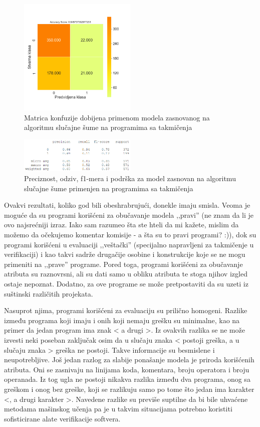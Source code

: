 \documentclass[12pt,oneside]{memoir}
\begin{document}
\begin{figure}[!ht]
  \centering
  \includegraphics[width=0.5\textwidth]{RF_c_files_confussion_matrix}
  \caption{Matrica konfuzije dobijena primenom modela zasnovanog na algoritmu slučajne šume na programima sa takmičenja}
  \label{fig:confmfinal}
\end{figure}

\begin{figure}[!ht]
  \centering
  \includegraphics[width=0.5\textwidth]{extra_final}
  \caption{Preciznost, odziv, f1-mera i podrška za model zasnovan na algoritmu slučajne šume primenjen na programima sa takmičenja}
  \label{fig:extrafinal}
\end{figure}


Ovakvi rezultati, koliko god bili obeshrabrujući, donekle imaju smisla. Veoma je moguće da su programi korišćeni za obučavanje modela ,,pravi'' (ne znam da li je ovo najsrećniji izraz. Iako sam razumeo šta ste hteli da mi kažete, mislim da možemo da očekujemo komentar komisije - a šta su to pravi programi? :)), dok su programi korišćeni u evaluaciji ,,veštački'' (specijalno napravljeni za takmičenje u verifikaciji) i kao takvi sadrže drugačije osobine i konstrukcije koje se ne mogu primeniti na ,,prave'' programe. Pored toga, programi korišćeni za obučavanje atributa su raznovrsni, ali su dati samo u obliku atributa te stoga njihov izgled ostaje nepoznat. Dodatno, za ove programe se može pretpostaviti da su uzeti iz suštinski različitih projekata. 

Nasuprot njima, programi korišćeni za evaluaciju su prilično homogeni. Razlike između programa koji imaju i onih koji nemaju grešku su minimalne, kao na primer da jedan program ima znak < a drugi >. Iz ovakvih razlika se ne može izvesti neki poseban zaključak osim da u slučaju znaka < postoji greška, a u slučaju znaka > greška ne postoji. Takve informacije su besmislene i neupotrebljive. Još jedan razlog za slabije ponašanje modela je priroda korišćenih atributa. Oni se zasnivaju na linijama koda, komentara, broju operatora i broju operanada. Iz tog ugla ne postoji nikakva razlika između dva programa, onog sa greškom i onog bez greške, koji se razlikuju samo po tome što jedan ima karakter <, a drugi karakter >. Navedene razlike su previše suptilne da bi bile uhvaćene metodama mašinskog učenja pa je u takvim situacijama potrebno koristiti sofisticirane alate verifikacije softvera.
\end{document}
